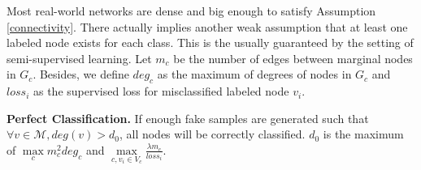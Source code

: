 Most real-world networks are dense and big enough to satisfy Assumption \ref{connectivity}. 
There actually implies another weak assumption that at least one labeled node exists for each class. This is the usually guaranteed by the setting of semi-supervised learning.
Let $m_c$ be the number of edges between marginal nodes in $G_c$. Besides, we define $deg_c$ as the maximum of degrees of nodes in $G_c$ and $loss_i$ as the supervised loss for misclassified labeled node $v_i$.
	
\begin{theorem} \textbf{Perfect Classification.} 
If enough fake samples are generated such that $\forall v \in \mathcal{M}, deg(v) > d_0$, all nodes will be correctly classified. $d_0$ is the maximum of $\max\limits_cm_c^2deg_c$  and $\max\limits_{c,v_i\in V_c}\frac{\lambda m_c}{loss_i}$.
\end{theorem}
